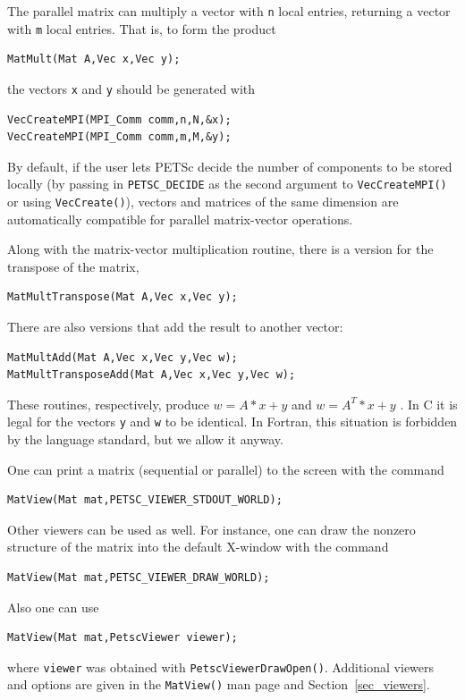 The parallel matrix can multiply a vector with \lstinline{n}
local entries, returning a vector with \lstinline{m} local entries. That is,
to form the product
\begin{lstlisting}
MatMult(Mat A,Vec x,Vec y);
\end{lstlisting}
the vectors \lstinline{x} and \lstinline{y} should be generated with
\begin{lstlisting}
VecCreateMPI(MPI_Comm comm,n,N,&x);
VecCreateMPI(MPI_Comm comm,m,M,&y);
\end{lstlisting}
By default, if the user lets PETSc decide the number of components to
be stored locally (by passing in \lstinline{PETSC_DECIDE} as the second
argument to \lstinline{VecCreateMPI()} or using \lstinline{VecCreate()}), vectors
and matrices of the same dimension are automatically compatible for
parallel matrix-vector operations.

Along with the matrix-vector multiplication routine, there is
a version for the transpose of the matrix,
\begin{lstlisting}
MatMultTranspose(Mat A,Vec x,Vec y);
\end{lstlisting}
There are also versions that add the result
to another vector:
\begin{lstlisting}
MatMultAdd(Mat A,Vec x,Vec y,Vec w);
MatMultTransposeAdd(Mat A,Vec x,Vec y,Vec w);
\end{lstlisting}
These routines, respectively, produce $ w = A*x + y $ and $ w = A^{T}*x + y$ .
In C it is legal for the vectors \lstinline{y} and \lstinline{w} to be identical.
In Fortran, this situation is forbidden by the language standard,
but we allow it anyway.

One can print a matrix (sequential or parallel) to the screen with the
command
\begin{lstlisting}
MatView(Mat mat,PETSC_VIEWER_STDOUT_WORLD);
\end{lstlisting}
Other viewers can be used as well. For instance, one can draw the
nonzero structure of the matrix into the default X-window with the
command
\begin{lstlisting}
MatView(Mat mat,PETSC_VIEWER_DRAW_WORLD);
\end{lstlisting}
Also one can use
\begin{lstlisting}
MatView(Mat mat,PetscViewer viewer);
\end{lstlisting}
where \lstinline{viewer} was obtained with \lstinline{PetscViewerDrawOpen()}.
Additional viewers and options are given in the \lstinline{MatView()} man
page and Section~\ref{sec_viewers}.

